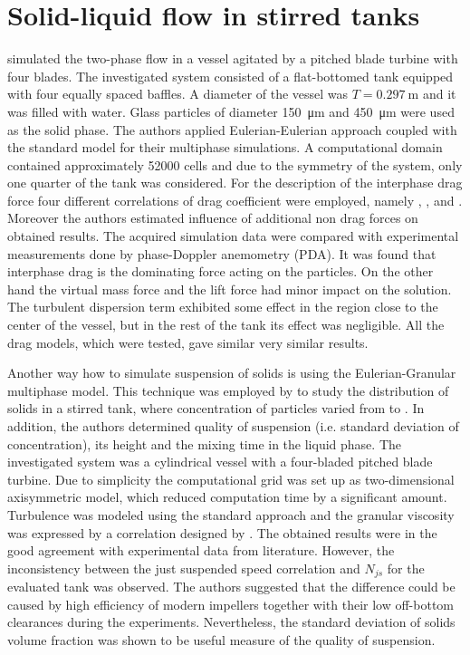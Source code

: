 \section{Solid-liquid flow in stirred tanks}
\citet{lju01} simulated the two-phase flow in a vessel agitated by a pitched blade turbine with four blades. The investigated system consisted of a flat-bottomed tank equipped with four equally spaced baffles. A diameter of the vessel was $T=\SI{0.297}{\meter}$ and it was filled with water. Glass particles of diameter \SI{150}{\micro\meter} and \SI{450}{\micro\meter} were used as the solid phase. The authors applied Eulerian-Eulerian approach coupled with the standard \keps{} model for their multiphase simulations. A computational domain contained approximately \num{52000} cells and due to the symmetry of the system, only one quarter of the tank was considered. For the description of the interphase drag force four different correlations of drag coefficient were employed, namely \citet{schi32}, \citet{ish79}, \citet{ihme72} and \citet{bru98}. Moreover the authors estimated influence of additional non drag forces on obtained results. The acquired simulation data were compared with experimental measurements done by phase-Doppler anemometry (PDA). It was found that interphase drag is the dominating force acting on the particles. On the other hand the virtual mass force and the lift force had minor impact on the solution. The turbulent dispersion term exhibited some effect in the region close to the center of the vessel, but in the rest of the tank its effect was negligible. All the drag models, which were tested, gave similar very similar results.

Another way how to simulate suspension of solids is using the Eulerian-Granular multiphase model. This technique was employed by \citet{oshi02} to study the distribution of solids in a stirred tank, where concentration of particles varied from  to . In addition, the authors determined quality of suspension (i.e. standard deviation of concentration), its height and the mixing time in the liquid phase. The investigated system was a cylindrical vessel with a four-bladed pitched blade turbine. Due to simplicity the computational grid was set up as two-dimensional axisymmetric model, which reduced computation time by a significant amount. Turbulence was modeled using the standard \keps{} approach and the granular viscosity was expressed by a correlation designed by \citet{syam93}. The obtained results were in the good agreement with experimental data from literature. However, the inconsistency between the just suspended speed correlation and $N_{js}$ for the evaluated tank was observed. The authors suggested that the difference could be caused by high efficiency of modern impellers together with their low off-bottom clearances during the experiments. Nevertheless, the standard deviation of solids volume fraction was shown to be useful measure of the quality of suspension. 

